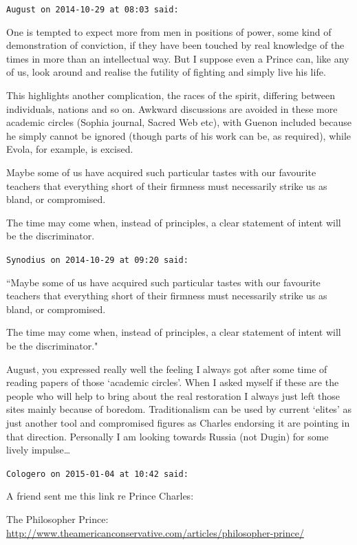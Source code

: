 \begin{footnotesize}
\begin{sffamily}
\hfill

\texttt{August on 2014-10-29 at 08:03 said: }

One is tempted to expect more from men in positions of power, some kind of demonstration of conviction, if they have been touched by real knowledge of the times in more than an intellectual way. But I suppose even a Prince can, like any of us, look around and realise the futility of fighting and simply live his life. 

This highlights another complication, the races of the spirit, differing between individuals, nations and so on. Awkward discussions are avoided in these more academic circles (Sophia journal, Sacred Web etc), with Guenon included because he simply cannot be ignored (though parts of his work can be, as required), while Evola, for example, is excised.

Maybe some of us have acquired such particular tastes with our favourite teachers that everything short of their firmness must necessarily strike us as bland, or compromised.

The time may come when, instead of principles, a clear statement of intent will be the discriminator.


\hfill

\texttt{Synodius on 2014-10-29 at 09:20 said: }

``Maybe some of us have acquired such particular tastes with our favourite teachers that everything short of their firmness must necessarily strike us as bland, or compromised.

The time may come when, instead of principles, a clear statement of intent will be the discriminator."

August, you expressed really well the feeling I always got after some time of reading papers of those `academic circles'. When I asked myself if these are the people who will help to bring about the real restoration I always just left those sites mainly because of boredom. Traditionalism can be used by current `elites' as just another tool and compromised figures as Charles endorsing it are pointing in that direction. Personally I am looking towards Russia (not Dugin) for some lively impulse…


\hfill

\texttt{Cologero on 2015-01-04 at 10:42 said: }

A friend sent me this link re Prince Charles:

The Philosopher Prince: \url{http://www.theamericanconservative.com/articles/philosopher-prince/}


\end{sffamily}
\end{footnotesize}
